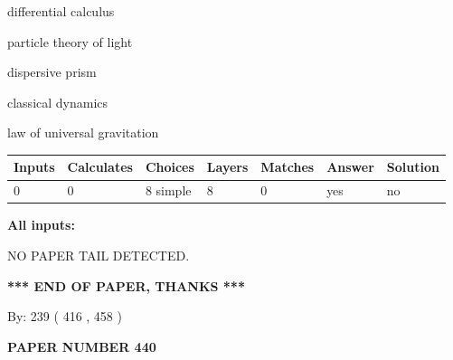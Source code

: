 \documentclass[12pt]{article}
\begin{document}
 
differential calculus
 
 
particle theory of light
 
 
dispersive prism
 
 
classical dynamics
 
 
law of universal gravitation
 
 
\noindent{}
 
 
   
   
   
   
\noindent\begin{tabular}{|l|l|l|l|l|l|l|}
 \hline
Inputs & Calculates & Choices & Layers & Matches & Answer & Solution \\ \hline
 0  & 
 0  & 
 8
  simple  
  & 
 8  & 
 0  & 
  yes & 
  no 
  \\ \hline
 \end{tabular}
   
   
   
   
\noindent{}
   
   
   
   
\noindent\vspace{0.1in}\hspace{-0.08in} {\textbf{\Large{All inputs: }}}
   
   
   
   
\vspace{2.0in} NO PAPER TAIL DETECTED.
   
   
   
   
\vspace{1.0in} 
{\textbf{\large{ *** END OF PAPER, THANKS *** }}} 
   
   
\hspace{1.0in} By: 
 239 ( 416 ,  458 )
   
   
   
   
\newpage 
\setcounter{page}{ 
   440001 } 
   
   
   
   
 {\textbf{ \Large{ PAPER NUMBER  440  }}}
   
   
\vspace{0.2in}
   
   
   
\end{document}
